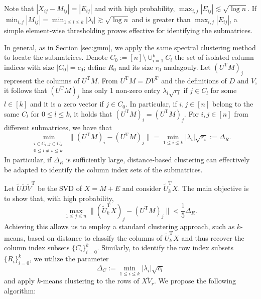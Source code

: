 \documentclass[reqno]{amsart}
\newcommand{\T}{\mathrm{T}}
\theoremstyle{plain}
\theoremstyle{definition}
\begin{document}
Note that $|X_{ij} - M_{ij}| = |E_{ij}|$ and with high probability, $\max_{i,j}|E_{ij}| \lesssim \sqrt{\log n}$. If $\min_{i,j} |M_{ij}| = \min_{1\le l \le k} |\lambda_l| \gtrsim \sqrt{\log n}$ and is greater than $\max_{i,j}|E_{ij}| $, a simple element-wise thresholding proves effective for identifying the submatrices. 

In general, as in Section \ref{sec:gmm}, we apply the same spectral clustering method to locate the submatrices. Denote $C_0:=[n] \setminus \cup_{i=1}^k C_i$ the set of isolated column indices with size $|C_0|=c_0$; define $R_0$ and its size $r_0$ analagouly. Let $(U^\T M)_j$ represent the columns of $U^\T M$. From $U^\T M = D V^\T$ and the definitions of $D$ and $V$, it follows that $(U^\T M)_j$ has only 1 non-zero entry $\lambda_l \sqrt{r_l}$ if $j \in C_l$ for some $l\in [k]$ and it is a zero vector if $j \in C_0$. In particular, if $i,j \in [n]$ belong to the same $C_l$ for $0\le l \le k$, it holds that $(U^\T M)_i = (U^\T M)_j$. For $i,j \in [n]$ from different submatrices, we have that $$\min_{\substack{i \in C_{l}, j \in C_{s}, \\0\le l \neq s\le k}}\|(U^\T M)_i - (U^\T M)_j\| = \min_{1\le i \le k}|\lambda_i| \sqrt{r_i} :=\Delta_R.$$ 
In particular, if $\Delta_R$ is sufficiently large, distance-based clustering can effectively be adapted to identify the column index sets of the submatrices.

Let $\widetilde U \widetilde D \widetilde V^\T$ be the SVD of $X=M+E$ and consider $\widetilde U_k^\T X$. The main objective is to show that, with high probability, 
$$\max_{1\le j \le n}\| (\widetilde U_k^\T X)_j - (U^\T M)_j \| < \frac{1}{5} \Delta_R.$$
Achieving this allows us to employ a standard clustering approach, such as 
$k$-means, based on distance to classify the columns of $\widetilde U_k^\T X$ and thus recover the column index subsets $\{ C_i\}_{i=0}^k$. Similarly, to identify the row index subsets  $\{ R_i\}_{i=0}^k$, we utilize the parameter 
$$
\Delta_C:= \min_{1\le i \le k}|\lambda_i| \sqrt{c_i}
$$
and apply $k$-means clustering to the rows of $X \widetilde V_r$. We propose the following algorithm: %
\end{document}
